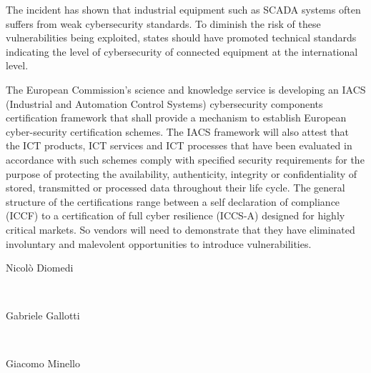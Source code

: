 \documentclass[12pt]{article}
\begin{document}
The incident has shown that industrial equipment such as SCADA systems often suffers from weak cybersecurity standards. To diminish the risk of these vulnerabilities being exploited, states should have promoted technical standards indicating the level of cybersecurity of connected equipment at the international level.

The European Commission’s science and knowledge service is developing an IACS (Industrial and Automation Control Systems) cybersecurity components certification framework  that shall provide a mechanism to establish European cyber-security certification schemes. The IACS framework will also attest that the ICT products, ICT services and ICT processes that have been evaluated in accordance with such schemes comply with specified security requirements for the purpose of protecting the availability, authenticity, integrity or confidentiality of stored, transmitted or processed data throughout their life cycle. The general structure of  the certifications range between a self declaration of compliance (ICCF) to a certification of full cyber resilience (ICCS-A) designed for highly critical markets. So vendors will need to demonstrate that they have eliminated involuntary and malevolent opportunities to introduce vulnerabilities.\cite{eth}


\begin{flushright}
Nicolò Diomedi
\end{flushright}
\\
\begin{flushright}
Gabriele Gallotti
\end{flushright}
\\
\begin{flushright}
Giacomo Minello\\
\end{flushright}

\newpage
\printbibliography[heading=bibintoc]
\end{document}
